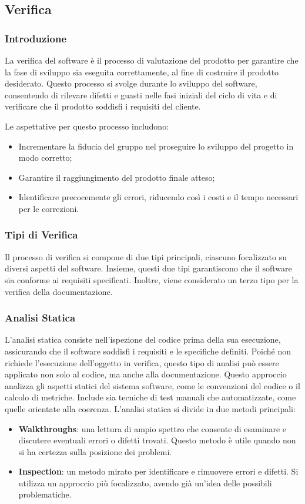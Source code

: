 \subsection{Verifica}
\subsubsection{Introduzione}
La verifica del software è il processo di valutazione del prodotto per garantire che la fase di sviluppo 
sia eseguita correttamente, al fine di costruire il prodotto desiderato. 
Questo processo si svolge durante lo sviluppo del software, consentendo di rilevare difetti e guasti 
nelle fasi iniziali del ciclo di vita e di verificare che il prodotto soddisfi i requisiti del cliente.

Le aspettative per questo processo includono:
\begin{itemize}
    \item Incrementare la fiducia del gruppo nel proseguire lo sviluppo del progetto in modo corretto;
    \item Garantire il raggiungimento del prodotto finale atteso;
    \item Identificare precocemente gli errori, riducendo così i costi e il tempo necessari per le correzioni.
\end{itemize}

\subsubsection{Tipi di Verifica}
Il processo di verifica si compone di due tipi principali, ciascuno focalizzato su diversi aspetti del software. 
Insieme, questi due tipi garantiscono che il software sia conforme ai requisiti specificati. 
Inoltre, viene considerato un terzo tipo per la verifica della documentazione.

\subsubsection*{Analisi Statica}
L’analisi statica consiste nell’ispezione del codice prima della sua esecuzione, assicurando che il software soddisfi 
i requisiti e le specifiche definiti. Poiché non richiede l’esecuzione dell’oggetto in verifica, questo tipo di analisi 
può essere applicato non solo al codice, ma anche alla documentazione.
Questo approccio analizza gli aspetti statici del sistema software, come le convenzioni del codice o il calcolo di metriche. 
Include sia tecniche di test manuali che automatizzate, come quelle orientate alla coerenza.  
L’analisi statica si divide in due metodi principali:
\begin{itemize}
    \item \textbf{Walkthroughs}: una lettura di ampio spettro che consente di esaminare e discutere 
    eventuali errori o difetti trovati. Questo metodo è utile quando non si ha certezza sulla posizione dei problemi.
    \item \textbf{Inspection}: un metodo mirato per identificare e rimuovere errori e difetti. 
    Si utilizza un approccio più focalizzato, avendo già un'idea delle possibili problematiche.
\end{itemize}

